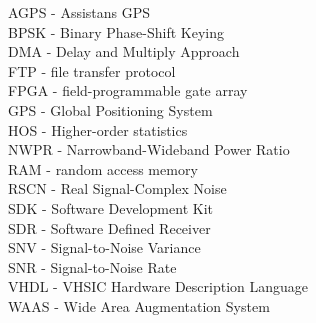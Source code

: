 \noindent
AGPS - Assistans GPS						\\
BPSK - Binary Phase-Shift Keying				\\
DMA - Delay and Multiply Approach				\\
FTP - file transfer protocol					\\
FPGA - field-programmable gate array 				\\
GPS - Global Positioning System					\\
HOS - Higher-order statistics					\\
NWPR - Narrowband-Wideband Power Ratio				\\
RAM - random access memory					\\
RSCN - Real Signal-Complex Noise				\\
SDK - Software Development Kit					\\
SDR - Software Defined Receiver					\\
SNV - Signal-to-Noise Variance					\\
SNR - Signal-to-Noise Rate					\\
VHDL - VHSIC Hardware Description Language			\\
WAAS - Wide Area Augmentation System				\\


\newpage

